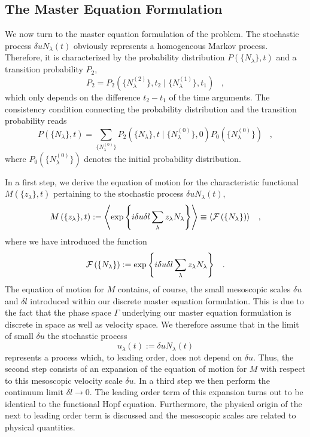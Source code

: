 \subsection{The Master Equation Formulation}
We now turn to the master equation formulation of the problem.
The stochastic process $\delta u N_{\lambda}(t)$ obviously
represents a
homogeneous Markov process.
Therefore, it is characterized by the probability distribution
$P \left( \{N_{\lambda}\} ,t \right)$ and a transition
probability $P_2$,
\begin{equation}
P_2 =
P_2 \left( \{N_{\lambda}^{(2)} \} , t_2 \mid
\{N_{\lambda}^{(1)} \} ,
t_1 \right)
\;\;\; ,        
\end{equation}
which only depends on the difference $t_2 - t_1$ of the time
arguments. The consistency condition connecting the probability
distribution and the transition probability reads
\begin{equation}
P \left( \{N_{\lambda} \},t \right) = \sum_{\{N_{\lambda}^{(0)}\}}
P_2 \left( \{N_{\lambda} \} , t \mid \{N_{\lambda}^{(0)} \} ,
0 \right)
P_0 \left( \{N_{\lambda}^{(0)} \} \right) \;\;\; ,   \label{PROBMEQ}
\end{equation}
where $P_0 \left( \{N_{\lambda}^{(0)} \} \right)$ denotes the initial
probability distribution.

In a first step, we derive the equation of motion
for the
characteristic functional $M\left( \{ z_{\lambda} \},t \right)$
pertaining to the stochastic process $\delta u N_{\lambda}(t)$,
\begin{equation}
M \left( \{z_{\lambda} \},t \right) := \left\langle
\exp \left\{ i\delta u\delta l \sum_{\lambda} z_{\lambda}
N_{\lambda} \right\}
\right \rangle \equiv \left\langle {\cal{F}} \left(
\{N_{\lambda} \} \right)
\right\rangle
\;\;\; ,           \label{GENFUNC}
\end{equation}
where we have introduced the function
\begin{displaymath}
{\cal{F}} \left( \{N_{\lambda} \} \right)
:= \exp \left\{ i\delta u \delta l
\sum_{\lambda} z_{\lambda} N_{\lambda}
\right\} \;\;\; .
\end{displaymath}
The equation of motion for $M$ contains,
of course, the small mesoscopic scales
$\delta u$ and $\delta l$ introduced
within our discrete master equation
formulation. This is due to the fact that the phase space $\Gamma$
underlying our master
equation formulation is discrete in space as well as velocity space.
We therefore assume that in the limit of small $\delta u$
the stochastic process
\begin{displaymath}
u_{\lambda}(t) := \delta u N_{\lambda}(t)
\end{displaymath}
represents a process which, to leading order, does not depend on
$\delta u$.
Thus, the second step consists of an expansion
of the equation of motion for $M$
with respect to this mesoscopic velocity scale
$\delta u$. In a third step
we then perform the continuum limit $\delta l \longrightarrow 0$.
The leading order term of this
expansion turns out to be identical to the functional Hopf equation.
Furthermore, the physical origin of the next to leading order
term is
discussed and the mesoscopic scales are related to
physical quantities.

